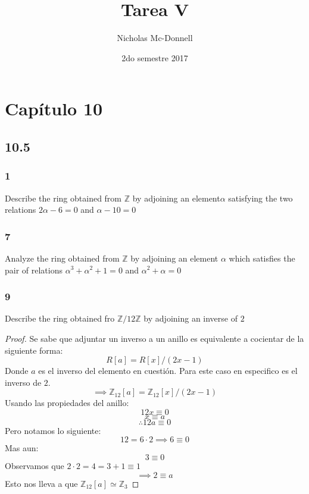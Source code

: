 \documentclass[11pt]{article}
\title{Tarea V}
\author{Nicholas Mc-Donnell}
\date{2do semestre 2017}
\newcommand{\set}[1]{\mathbb{#1}}
\theoremstyle{definition}
\begin{document}
        \maketitle
        \newpage

        \tableofcontents
        \newpage
        \section{Capítulo 10}
        \subsection{10.5}
        \subsubsection{1}
        Describe the ring obtained from $\set{Z}$ by adjoining an element$\alpha$ satisfying the two relations $2\alpha-6=0$ and $\alpha-10=0$

        \subsubsection{7}
        Analyze the ring obtained from $\set{Z}$ by adjoining an element $\alpha$ which satisfies the pair of relations $\alpha^3+\alpha^2+1=0$ and $\alpha^2+\alpha=0$

        \subsubsection{9}
        Describe the ring obtained fro $\set{Z}/12\set{Z}$ by adjoining an inverse of $2$
        \begin{proof}
            Se sabe que adjuntar un inverso a un anillo es equivalente a cocientar de la siguiente forma:
            \[R[a]=R[x]/(2x-1)\]
            Donde $a$ es el inverso del elemento en cuestión. Para este caso en especifico es el inverso de $2$.
            \[\implies\set{Z}_{12}[a]=\set{Z}_{12}[x]/(2x-1)\]
            Usando las propiedades del anillo:
            \[12x\equiv 0\]
            \[x\equiv a\]
            \[\therefore 12a\equiv 0\]
            Pero notamos lo siguiente:
            \[12=6\cdot 2\implies 6\equiv 0\]
            Mas aun:
            \[3\equiv 0\]
            Observamos que $2\cdot 2=4=3+1\equiv 1$
            \[\implies 2\equiv a\]
            Esto nos lleva a que $\set{Z}_{12}[a]\simeq\set{Z}_3$
        \end{proof}
\end{document}
